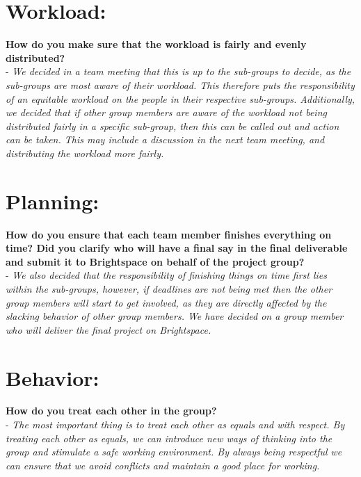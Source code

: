 \section*{\textcolor{Delft_Blue}{\textbf{Workload:\vspace{5pt}}}}
\textbf{How do you make sure that the workload is fairly and evenly distributed?\\ }
    - \textit{We decided in a team meeting that this is up to the sub-groups to decide, as the sub-groups are most aware of their workload. This therefore puts the responsibility of an equitable workload on the people in their respective sub-groups. Additionally, we decided that if other group members are aware of the workload not being distributed fairly in a specific sub-group, then this can be called out and action can be taken. This may include a discussion in the next team meeting, and distributing the workload more fairly.}\\

\section*{\textcolor{Delft_Blue}{\textbf{Planning:\vspace{5pt}}}}
\textbf{How do you ensure that each team member finishes everything on time? Did you clarify who will have a final say in the final deliverable and submit it to Brightspace on behalf of the project group?\\}
    - \textit{We also decided that the responsibility of finishing things on time first lies within the sub-groups, however, if deadlines are not being met then the other group members will start to get involved, as they are directly affected by the slacking behavior of other group members. We have decided on a group member who will deliver the final project on Brightspace.}\\
    
\section*{\textcolor{Delft_Blue}{\textbf{Behavior:\vspace{5pt}}}}
\textbf{How do you treat each other in the group? \\}
    - \textit{The most important thing is to treat each other as equals and with respect. By treating each other as equals, we can introduce new ways of thinking into the group and stimulate a safe working environment. By always being respectful we can ensure that we avoid conflicts and maintain a good place for working.}\\

